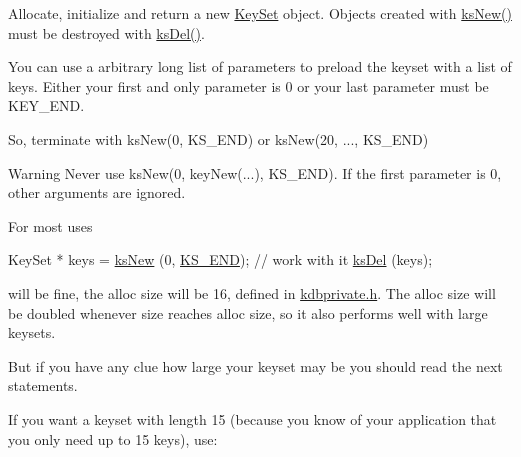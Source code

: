 Allocate, initialize and return a new \hyperlink{classkdb_1_1KeySet}{Key\+Set} object. Objects created with \hyperlink{group__keyset_ga671e1aaee3ae9dc13b4834a4ddbd2c3c}{ks\+New()} must be destroyed with \hyperlink{group__keyset_ga27e5c16473b02a422238c8d970db7ac8}{ks\+Del()}.

You can use a arbitrary long list of parameters to preload the keyset with a list of keys. Either your first and only parameter is 0 or your last parameter must be K\+E\+Y\+\_\+\+E\+ND.

So, terminate with ks\+New(0, K\+S\+\_\+\+E\+N\+D) or ks\+New(20, ..., K\+S\+\_\+\+E\+ND)

\begin{DoxyWarning}{Warning}
Never use ks\+New(0, key\+New(...), K\+S\+\_\+\+E\+ND). If the first parameter is 0, other arguments are ignored.
\end{DoxyWarning}
For most uses


\begin{DoxyCodeInclude}
KeySet * keys = \hyperlink{group__keyset_ga671e1aaee3ae9dc13b4834a4ddbd2c3c}{ksNew} (0, \hyperlink{kdbenum_8c_a7a28fce3773b2c873c94ac80b8b4cd54}{KS\_END});
\textcolor{comment}{// work with it}
\hyperlink{group__keyset_ga27e5c16473b02a422238c8d970db7ac8}{ksDel} (keys);
\end{DoxyCodeInclude}
 will be fine, the alloc size will be 16, defined in \hyperlink{kdbprivate_8h}{kdbprivate.\+h}. The alloc size will be doubled whenever size reaches alloc size, so it also performs well with large keysets.

But if you have any clue how large your keyset may be you should read the next statements.

If you want a keyset with length 15 (because you know of your application that you only need up to 15 keys), use\+:


